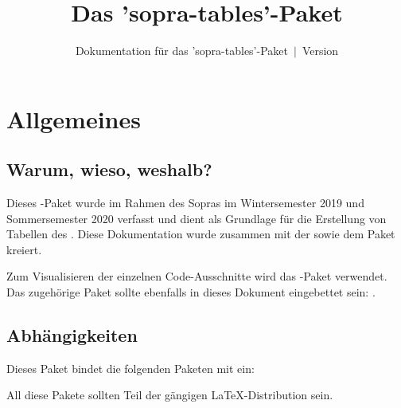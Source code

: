 \documentclass{sopra-base}
\title{Das 'sopra-tables'-Paket}
\subtitle[Dokumentation für das 'sopra-tables'-Paket]{Dokumentation für das 'sopra-tables'-Paket~$\mid$~Version \thesotversion}
\begin{document}
    \maketitle%
%
%

%
%
%
%

\section{Allgemeines}
\subsection{Warum, wieso, weshalb?}
    Dieses \LaTeXe-Paket wurde im Rahmen des Sopras im
    Wintersemester 2019 und Sommersemester 2020 verfasst und dient als
    Grundlage für die Erstellung von Tabellen
    des . Diese Dokumentation wurde zusammen mit der
     sowie dem Paket  kreiert.\par
    Zum Visualisieren der einzelnen Code-Ausschnitte wird das
    -Paket verwendet.
    Das zugehörige Paket sollte ebenfalls in dieses Dokument eingebettet sein: .
\subsection{Abhängigkeiten}
    Dieses Paket bindet die folgenden Paketen mit ein:
    \begin{multicols}{3}
    \end{multicols}
    All diese Pakete sollten Teil der gängigen \LaTeX-Distribution sein.
\end{document}
